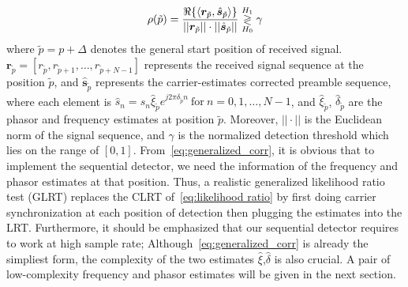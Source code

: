 \begin{equation}
    \label{eq:generalized_corr}
    \rho(\tilde{p})=
    \frac{\Re\{\langle
      \bm{r}_{\tilde{p}},\hat{\bm{s}}_{\tilde{p}}\rangle\}}
    {||\bm{r}_{\tilde{p}}||\cdot||\hat{\bm{s}}_{\tilde{p}}||} \mathrel{\mathop\gtrless\limits^{H_1}_{H_0}} \gamma
  \end{equation}
where $\tilde{p}{=}p{+}\Delta$ denotes the general start position of received signal. 
$\bm{r}_{\tilde{p}}{=}[r_{\tilde{p}},r_{\tilde{p}+1},\ldots,r_{\tilde{p}+N-1}]$ represents the received signal sequence at
the position $\tilde{p}$, and $\hat{\bm{s}}_{\tilde{p}}$ represents the carrier-estimates corrected preamble sequence, where each element is 
$\hat{s}_{n}=s_n\hat{\xi}_{\tilde{p}}e^{j2\pi\hat{\delta}_{\tilde{p}}n}~\text{for}~n=0,1,\ldots,N-1$, and $\hat{\xi}_{\tilde{p}}$, $\hat{\delta}_{\tilde{p}}$
are the phasor and frequency estimates at position $\tilde{p}$. Moreover, $||\cdot||$ is the Euclidean norm of the signal sequence,
and $\gamma$ is the normalized detection threshold which lies on the range of $[0,1]$. 
From~\eqref{eq:generalized_corr}, it is obvious that to implement the sequential detector, we need the information
of the frequency and phasor estimates at that position. Thus, a realistic generalized likelihood ratio test (GLRT) replaces the CLRT of~\eqref{eq:likelihood ratio}
by first doing carrier synchronization at each position of detection then plugging the estimates into the LRT.
Furthermore, it should be emphasized that our sequential detector requires to work at high sample rate; Although~\eqref{eq:generalized_corr}
is already the simpliest form, the complexity of the two estimates $\hat{\xi}$,$\hat{\delta}$ is also crucial. 
A pair of low-complexity frequency and phasor estimates will be given in the next section.





